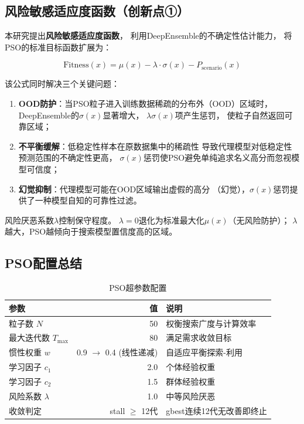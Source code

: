 \subsection{风险敏感适应度函数（创新点①）}

本研究提出\textbf{风险敏感适应度函数}，
利用DeepEnsemble的不确定性估计能力，
将PSO的标准目标函数扩展为：

\begin{equation}
    \text{Fitness}(x) = \mu(x) - \lambda \cdot \sigma(x) - P_{\text{scenario}}(x)
    \label{eq:risk_sensitive}
\end{equation}

该公式同时解决三个关键问题：

\begin{enumerate}
    \item \textbf{OOD防护}：当PSO粒子进入训练数据稀疏的分布外（OOD）区域时，
        DeepEnsemble的$\sigma(x)$显著增大，
        $\lambda\sigma(x)$项产生惩罚，
        使粒子自然返回可靠区域；
    \item \textbf{不平衡缓解}：低稳定性样本在原数据集中的稀疏性
        导致代理模型对低稳定性预测范围的不确定性更高，
        $\sigma(x)$惩罚使PSO避免单纯追求名义高分而忽视模型可信度；
    \item \textbf{幻觉抑制}：代理模型可能在OOD区域输出虚假的高分
        （幻觉），$\sigma(x)$惩罚提供了一种模型自知的可靠性过滤。
\end{enumerate}

风险厌恶系数$\lambda$控制保守程度。
$\lambda = 0$退化为标准最大化$\mu(x)$（无风险防护）；
$\lambda$越大，PSO越倾向于搜索模型置信度高的区域。

\subsection{PSO配置总结}

\begin{table}[H]
\centering
\caption{PSO超参数配置}
\begin{tabular}{lrl}
\toprule
参数 & 值 & 说明 \\
\midrule
粒子数 $N$ & 50 & 权衡搜索广度与计算效率 \\
最大迭代数 $T_{\text{max}}$ & 80 & 满足需求收敛目标 \\
惯性权重 $w$ & 0.9 $\to$ 0.4 (线性递减) & 自适应平衡探索-利用 \\
学习因子 $c_1$ & 2.0 & 个体经验权重 \\
学习因子 $c_2$ & 1.5 & 群体经验权重 \\
风险系数 $\lambda$ & 1.0 & 中等风险厌恶 \\
收敛判定 & stall $\geq$ 12代 & gbest连续12代无改善即终止 \\
\bottomrule
\end{tabular}
\end{table}

